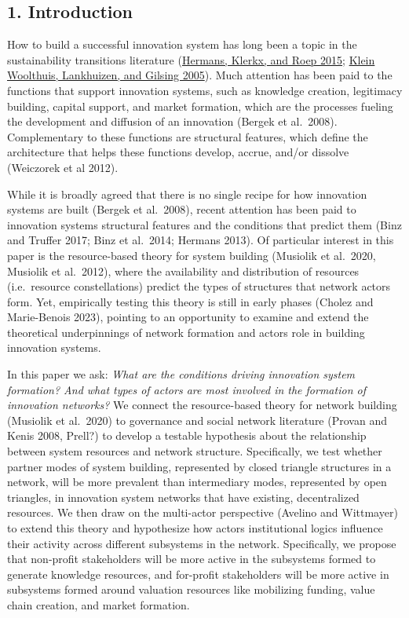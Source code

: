 \documentclass[twoside,12pt,final]{ucthesis-CA2012}
\begin{document}
\begin{ucmainmatter}

\hypertarget{introduction-3}{%
\section{1. Introduction}\label{introduction-3}}

How to build a successful innovation system has long been a topic in the
sustainability transitions literature (\protect\hyperlink{ref-Hermans_Klerkx_Roep_2015}{Hermans, Klerkx, and Roep 2015}; \protect\hyperlink{ref-Klein_Woolthuis_Lankhuizen_Gilsing_2005}{Klein Woolthuis, Lankhuizen, and Gilsing 2005}).
Much attention has been paid to the functions that support innovation
systems, such as knowledge creation, legitimacy building, capital
support, and market formation, which are the processes fueling the
development and diffusion of an innovation (Bergek et al.~2008).
Complementary to these functions are structural features, which define
the architecture that helps these functions develop, accrue, and/or
dissolve (Weiczorek et al 2012).

While it is broadly agreed that there is no single recipe for how
innovation systems are built (Bergek et al.~2008), recent attention has
been paid to innovation systems\textquotesingle{} structural features and the conditions
that predict them (Binz and Truffer 2017; Binz et al.~2014; Hermans
2013). Of particular interest in this paper is the resource-based theory
for system building (Musiolik et al.~2020, Musiolik et al.~2012), where
the availability and distribution of resources (i.e.~resource
constellations) predict the types of structures that network actors
form. Yet, empirically testing this theory is still in early phases
(Cholez and Marie-Benois 2023), pointing to an opportunity to examine
and extend the theoretical underpinnings of network formation and
actors\textquotesingle{} role in building innovation systems.

In this paper we ask: \emph{What are the conditions driving innovation system
formation? And what types of actors are most involved in the formation
of innovation networks?} We connect the resource-based theory for
network building (Musiolik et al.~2020) to governance and social network
literature (Provan and Kenis 2008, Prell?) to develop a testable
hypothesis about the relationship between system resources and network
structure. Specifically, we test whether \textquotesingle partner modes\textquotesingle{} of system
building, represented by closed triangle structures in a network, will
be more prevalent than \textquotesingle intermediary modes\textquotesingle, represented by open
triangles, in innovation system networks that have existing,
decentralized resources. We then draw on the multi-actor perspective
(Avelino and Wittmayer) to extend this theory and hypothesize how
actors\textquotesingle{} institutional logics influence their activity across different
subsystems in the network. Specifically, we propose that non-profit
stakeholders will be more active in the subsystems formed to generate
knowledge resources, and for-profit stakeholders will be more active in
subsystems formed around valuation resources like mobilizing funding,
value chain creation, and market formation.


\end{ucmainmatter}
\end{document}
